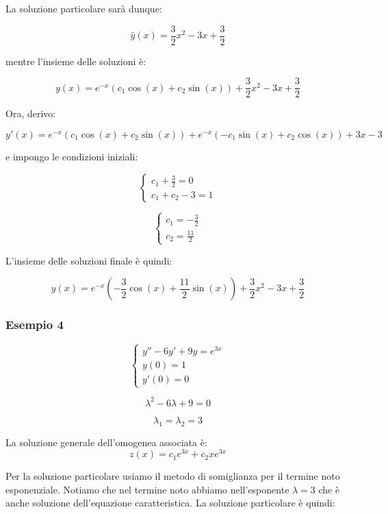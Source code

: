La soluzione particolare sarà dunque:

\[
    \bar{y} (x) = \frac{3}{2}x^{2}-3x+\frac{3}{2}
\]


mentre l'insieme delle soluzioni è:

\[
    y(x) = e ^{-x}(c_1 \cos(x) + c_2 \sin(x) ) + \frac{3}{2}x^{2}-3x+\frac{3}{2}
\]

Ora, derivo:

\[
    y'(x) = e ^{-x}(c_1 \cos(x)+ c_2 \sin(x)) + e ^{-x}(-c_1\sin(x)+c_2 \cos(x)) +3x -3
\]

e impongo le condizioni iniziali:

\begin{equation*}
    \begin{cases*}
        c_1 + \frac{3}{2} = 0 \\
        c_1 + c_2 -3 = 1
    \end{cases*}
\end{equation*}

\begin{equation*}
    \begin{cases*}
        c_1 = -\frac{3}{2} \\
        c_2 = \frac{11}{2}
    \end{cases*}
\end{equation*}

L'insieme delle soluzioni finale è quindi:

\[
    y(x) = e ^{-x}\left(-\frac{3}{2}\cos(x) + \frac{11}{2} \sin(x)\right) + \frac{3}{2}x^{2}-3x + \frac{3}{2}
\]

\filbreak{}
\subsubsection*{Esempio 4}

\begin{equation*}
    \begin{cases*}
        y''-6y' + 9y = e ^{3x} \\
        y(0) = 1               \\
        y'(0) = 0
    \end{cases*}
\end{equation*}

\[
    \lambda^{2} -6 \lambda + 9 = 0
\]

\[
    \lambda_1=\lambda_2=3
\]

La soluzione generale dell'omogenea associata è:
\[
    z(x)  = c_1 e ^{3x}+ c_2 x e ^{3x}
\]

Per la soluzione particolare usiamo il metodo di somiglianza per il termine noto esponenziale. Notiamo che nel termine noto abbiamo nell'esponente \(\lambda=3\) che è anche soluzione dell'equazione caratteristica. La soluzione particolare è quindi:

